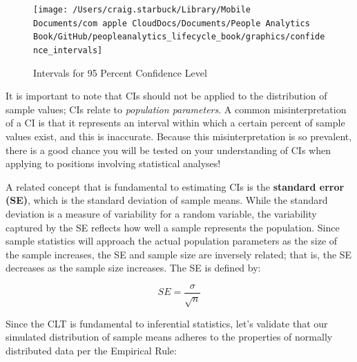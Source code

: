 \documentclass[]{book}
\newenvironment{Shaded}{\begin{snugshade}}{\end{snugshade}}
\newcommand{\CommentTok}[1]{\textcolor[rgb]{0.56,0.35,0.01}{\textit{#1}}}
\newcommand{\DecValTok}[1]{\textcolor[rgb]{0.00,0.00,0.81}{#1}}
\newcommand{\KeywordTok}[1]{\textcolor[rgb]{0.13,0.29,0.53}{\textbf{#1}}}
\newcommand{\NormalTok}[1]{#1}
\newcommand{\OperatorTok}[1]{\textcolor[rgb]{0.81,0.36,0.00}{\textbf{#1}}}
\newcommand{\StringTok}[1]{\textcolor[rgb]{0.31,0.60,0.02}{#1}}
\begin{document}
\begin{figure}

{\centering \texttt{[image: /Users/craig.starbuck/Library/Mobile Documents/com~apple~CloudDocs/Documents/People Analytics Book/GitHub/peopleanalytics\_lifecycle\_book/graphics/confidence\_intervals]} 

}

\caption{Intervals for 95 Percent Confidence Level}\label{fig:conf-int}
\end{figure}

It is important to note that CIs should not be applied to the distribution of sample values; CIs relate to \emph{population parameters}. A common misinterpretation of a CI is that it represents an interval within which a certain percent of sample values exist, and this is inaccurate. Because this misinterpretation is so prevalent, there is a good chance you will be tested on your understanding of CIs when applying to positions involving statistical analyses!

A related concept that is fundamental to estimating CIs is the \textbf{standard error (SE)}, which is the standard deviation of sample means. While the standard deviation is a measure of variability for a random variable, the variability captured by the SE reflects how well a sample represents the population. Since sample statistics will approach the actual population parameters as the size of the sample increases, the SE and sample size are inversely related; that is, the SE decreases as the sample size increases. The SE is defined by:

\[ SE = \frac{\sigma}{\sqrt{n}} \]

Since the CLT is fundamental to inferential statistics, let's validate that our simulated distribution of sample means adheres to the properties of normally distributed data per the Empirical Rule:

\begin{Shaded}
\end{Shaded}
\end{document}
